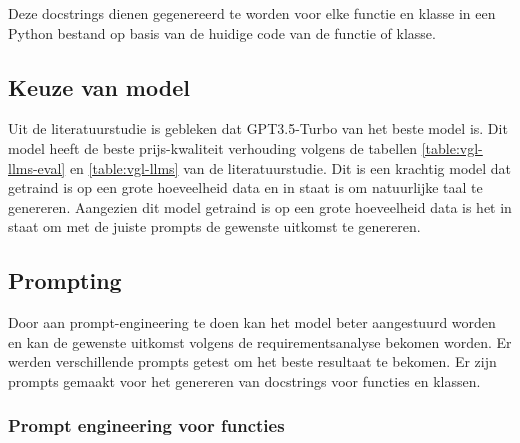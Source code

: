 Deze docstrings dienen gegenereerd te worden voor elke functie en klasse in een Python bestand op basis van de huidige code van de functie of klasse.

\subsection{Keuze van model}
\label{sec:bestanddocumentatie-model}

Uit de literatuurstudie is gebleken dat GPT3.5-Turbo van \textcite{OpenAi2024} het beste model is. 
Dit model heeft de beste prijs-kwaliteit verhouding volgens de tabellen \ref{table:vgl-llms-eval} en \ref{table:vgl-llms} van de literatuurstudie.
Dit is een krachtig model dat getraind is op een grote hoeveelheid data en in staat is om natuurlijke taal te genereren.
Aangezien dit model getraind is op een grote hoeveelheid data is het in staat om met de juiste prompts de gewenste uitkomst te genereren.

\subsection{Prompting}
\label{sec:bestanddocumentatie-prompting}

Door aan prompt-engineering te doen kan het model beter aangestuurd worden en kan de gewenste uitkomst volgens de requirementsanalyse bekomen worden.
Er werden verschillende prompts getest om het beste resultaat te bekomen.
Er zijn prompts gemaakt voor het genereren van docstrings voor functies en klassen. 

\subsubsection{Prompt engineering voor functies}

